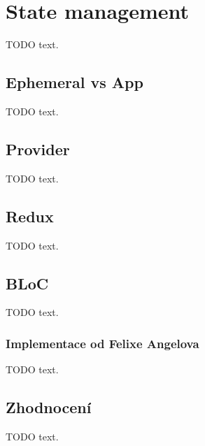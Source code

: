 \section{State management}

TODO text.

\subsection{Ephemeral vs App}

TODO text.

\subsection{Provider}

TODO text.

\subsection{Redux}

TODO text.

\subsection{BLoC}

TODO text.

\subsubsection{Implementace od Felixe Angelova}

TODO text.

\subsection{Zhodnocení}

TODO text.
